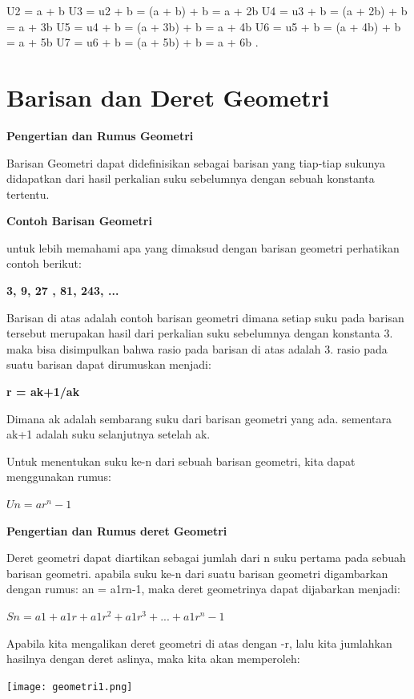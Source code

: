 \documentclass[11pt,fleqn]{book} %
\begin{document}
U2 = a + b
U3 = u2 + b = (a + b) + b = a + 2b
U4 = u3 + b = (a + 2b) + b = a + 3b
U5 = u4 + b = (a + 3b) + b = a + 4b
U6 = u5 + b = (a + 4b) + b = a + 5b
U7 = u6 + b = (a + 5b) + b = a + 6b
.
\section{Barisan dan Deret Geometri}
\textbf{Pengertian dan Rumus Geometri}

Barisan Geometri dapat didefinisikan sebagai barisan yang tiap-tiap sukunya didapatkan dari hasil perkalian suku sebelumnya dengan sebuah konstanta tertentu.

\textbf{Contoh Barisan Geometri}

 untuk lebih memahami apa yang dimaksud dengan barisan geometri perhatikan contoh berikut:
 
\textbf{3, 9, 27 , 81, 243, ...}

Barisan di atas adalah contoh barisan geometri dimana setiap suku pada barisan tersebut merupakan hasil dari perkalian suku sebelumnya dengan konstanta 3. maka bisa disimpulkan bahwa rasio pada barisan di atas adalah 3. rasio pada suatu barisan dapat dirumuskan menjadi:

\textbf{r = ak+1/ak}

Dimana ak adalah sembarang suku dari barisan geometri yang ada. sementara ak+1 adalah suku selanjutnya setelah ak.

Untuk menentukan suku ke-n dari sebuah barisan geometri, kita dapat menggunakan rumus:

\textbf{$Un = ar^n-1$}

\textbf{ Pengertian dan Rumus deret Geometri}

Deret geometri dapat diartikan sebagai jumlah dari n suku pertama pada sebuah barisan geometri. apabila suku ke-n dari suatu barisan geometri digambarkan dengan rumus: an = a1rn-1, maka deret geometrinya dapat dijabarkan menjadi:

\textbf{$Sn = a1 + a1r + a1r^2 + a1r^3 + ... + a1r^n-1$}

Apabila kita mengalikan deret geometri di atas dengan -r, lalu kita jumlahkan hasilnya dengan deret aslinya, maka kita akan memperoleh:

\texttt{[image: geometri1.png]} 

\end{document}
